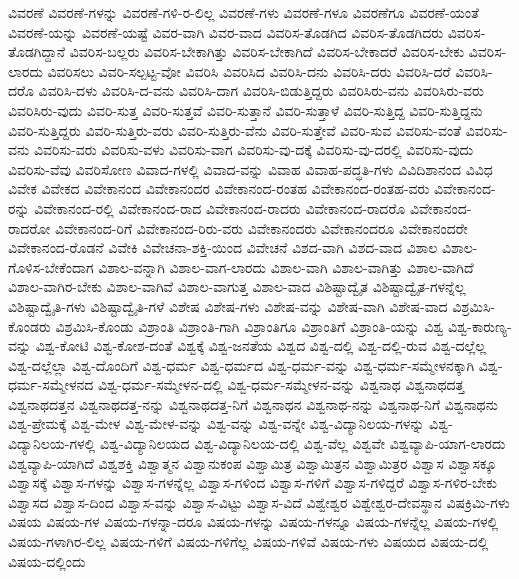 {ವಿವರಣೆ
ವಿವರಣೆ-ಗಳನ್ನು
ವಿವರಣೆ-ಗಳಿ-ರ-ಲಿಲ್ಲ
ವಿವರಣೆ-ಗಳು
ವಿವರಣೆ-ಗಳೂ
ವಿವರಣೆಗೂ
ವಿವರಣೆ-ಯಂತೆ
ವಿವರಣೆ-ಯನ್ನು
ವಿವರಣೆ-ಯಷ್ಟೆ
ವಿವರ-ವಾಗಿ
ವಿವರ-ವಾದ
ವಿವರಿಸ-ತೊಡಗಿದ
ವಿವರಿಸ-ತೊಡಗಿದರು
ವಿವರಿಸ-ತೊಡಗಿದ್ದಾನೆ
ವಿವರಿಸ-ಬಲ್ಲರು
ವಿವರಿಸ-ಬೇಕಾಗಿತ್ತು
ವಿವರಿಸ-ಬೇಕಾಗಿದೆ
ವಿವರಿಸ-ಬೇಕಾದರೆ
ವಿವರಿಸ-ಬೇಕು
ವಿವರಿಸ-ಲಾರದು
ವಿವರಿಸಲು
ವಿವರಿ-ಸಲ್ಪಟ್ಟ-ವೋ
ವಿವರಿಸಿ
ವಿವರಿಸಿದ
ವಿವರಿಸಿ-ದನು
ವಿವರಿಸಿ-ದರು
ವಿವರಿಸಿ-ದರೆ
ವಿವರಿಸಿ-ದರೊ
ವಿವರಿಸಿ-ದಳು
ವಿವರಿಸಿ-ದ-ವನು
ವಿವರಿಸಿ-ದಾಗ
ವಿವರಿಸಿ-ಬಿಡುತ್ತಿದ್ದರು
ವಿವರಿಸಿರು-ವನು
ವಿವರಿಸಿರು-ವರು
ವಿವರಿಸಿರು-ವುದು
ವಿವರಿ-ಸುತ್ತ
ವಿವರಿ-ಸುತ್ತವೆ
ವಿವರಿ-ಸುತ್ತಾನೆ
ವಿವರಿ-ಸುತ್ತಾಳೆ
ವಿವರಿ-ಸುತ್ತಿದ್ದ
ವಿವರಿ-ಸುತ್ತಿದ್ದನು
ವಿವರಿ-ಸುತ್ತಿದ್ದರು
ವಿವರಿ-ಸುತ್ತಿರು-ವರು
ವಿವರಿ-ಸುತ್ತಿರು-ವೆನು
ವಿವರಿ-ಸುತ್ತೇವೆ
ವಿವರಿ-ಸುವ
ವಿವರಿಸು-ವಂತೆ
ವಿವರಿಸು-ವನು
ವಿವರಿಸು-ವರು
ವಿವರಿಸು-ವಳು
ವಿವರಿಸು-ವಾಗ
ವಿವರಿಸು-ವು-ದಕ್ಕೆ
ವಿವರಿಸು-ವು-ದರಲ್ಲಿ
ವಿವರಿಸು-ವುದು
ವಿವರಿಸು-ವೆವು
ವಿವರಿಸೋಣ
ವಿವಾದ-ಗಳಲ್ಲಿ
ವಿವಾದ-ವನ್ನು
ವಿವಾಹ
ವಿವಾಹ-ಪದ್ಧತಿ-ಗಳು
ವಿವಿದಿಶಾನಂದ
ವಿವಿಧ
ವಿವೇಕ
ವಿವೇಕದ
ವಿವೇಕಾನಂದ
ವಿವೇಕಾನಂದರ
ವಿವೇಕಾನಂದ-ರಂತಹ
ವಿವೇಕಾನಂದ-ರಂತಹ-ವರು
ವಿವೇಕಾನಂದ-ರನ್ನು
ವಿವೇಕಾನಂದ-ರಲ್ಲಿ
ವಿವೇಕಾನಂದ-ರಾದ
ವಿವೇಕಾನಂದ-ರಾದರು
ವಿವೇಕಾನಂದ-ರಾದರೊ
ವಿವೇಕಾನಂದ-ರಾದರೋ
ವಿವೇಕಾನಂದ-ರಿಗೆ
ವಿವೇಕಾನಂದ-ರಿರು-ವರು
ವಿವೇಕಾನಂದರು
ವಿವೇಕಾನಂದರೂ
ವಿವೇಕಾನಂದರೇ
ವಿವೇಕಾನಂದ-ರೊಡನೆ
ವಿವೇಕಿ
ವಿವೇಚನಾ-ಶಕ್ತಿ-ಯಿಂದ
ವಿವೇಚನೆ
ವಿಶದ-ವಾಗಿ
ವಿಶದ-ವಾದ
ವಿಶಾಲ
ವಿಶಾಲ-ಗೊಳಿಸ-ಬೇಕೆಂದಾಗ
ವಿಶಾಲ-ವನ್ನಾಗಿ
ವಿಶಾಲ-ವಾಗ-ಲಾರದು
ವಿಶಾಲ-ವಾಗಿ
ವಿಶಾಲ-ವಾಗಿತ್ತು
ವಿಶಾಲ-ವಾಗಿದೆ
ವಿಶಾಲ-ವಾಗಿರ-ಬೇಕು
ವಿಶಾಲ-ವಾಗಿವೆ
ವಿಶಾಲ-ವಾಗುತ್ತ
ವಿಶಾಲ-ವಾದ
ವಿಶಿಷ್ಟಾದ್ವೈತ
ವಿಶಿಷ್ಟಾದ್ವೈತ-ಗಳನ್ನೆಲ್ಲ
ವಿಶಿಷ್ಟಾದ್ವೈತಿ-ಗಳು
ವಿಶಿಷ್ಟಾದ್ವೈತಿ-ಗಳೆ
ವಿಶೇಷ
ವಿಶೇಷ-ಗಳು
ವಿಶೇಷ-ವನ್ನು
ವಿಶೇಷ-ವಾಗಿ
ವಿಶೇಷ-ವಾದ
ವಿಶ್ರಮಿಸಿ-ಕೊಂಡರು
ವಿಶ್ರಮಿಸಿ-ಕೊಂಡು
ವಿಶ್ರಾಂತಿ
ವಿಶ್ರಾಂತಿ-ಗಾಗಿ
ವಿಶ್ರಾಂತಿಗೂ
ವಿಶ್ರಾಂತಿಗೆ
ವಿಶ್ರಾಂತಿ-ಯನ್ನು
ವಿಶ್ವ
ವಿಶ್ವ-ಕಾರುಣ್ಯ-ವನ್ನು
ವಿಶ್ವ-ಕೋಟಿ
ವಿಶ್ವ-ಕೋಶ-ದಂತೆ
ವಿಶ್ವಕ್ಕೆ
ವಿಶ್ವ-ಜನತೆಯ
ವಿಶ್ವದ
ವಿಶ್ವ-ದಲ್ಲಿ
ವಿಶ್ವ-ದಲ್ಲಿ-ರುವ
ವಿಶ್ವ-ದಲ್ಲೆಲ್ಲ
ವಿಶ್ವ-ದಲ್ಲೆಲ್ಲಾ
ವಿಶ್ವ-ದೊಂದಿಗೆ
ವಿಶ್ವ-ಧರ್ಮ
ವಿಶ್ವ-ಧರ್ಮದ
ವಿಶ್ವ-ಧರ್ಮ-ವನ್ನು
ವಿಶ್ವ-ಧರ್ಮ-ಸಮ್ಮೇಳನಕ್ಕಾಗಿ
ವಿಶ್ವ-ಧರ್ಮ-ಸಮ್ಮೇಳನದ
ವಿಶ್ವ-ಧರ್ಮ-ಸಮ್ಮೇಳನ-ದಲ್ಲಿ
ವಿಶ್ವ-ಧರ್ಮ-ಸಮ್ಮೇಳನ-ವನ್ನು
ವಿಶ್ವನಾಥ
ವಿಶ್ವನಾಥದತ್ತ
ವಿಶ್ವನಾಥದತ್ತನ
ವಿಶ್ವನಾಥದತ್ತ-ನನ್ನು
ವಿಶ್ವನಾಥದತ್ತ-ನಿಗೆ
ವಿಶ್ವನಾಥನ
ವಿಶ್ವನಾಥ-ನನ್ನು
ವಿಶ್ವನಾಥ-ನಿಗೆ
ವಿಶ್ವನಾಥನು
ವಿಶ್ವ-ಪ್ರೇಮಕ್ಕೆ
ವಿಶ್ವ-ಮೇಳ
ವಿಶ್ವ-ಮೇಳ-ವನ್ನು
ವಿಶ್ವ-ವನ್ನು
ವಿಶ್ವ-ವನ್ನೇ
ವಿಶ್ವ-ವಿದ್ಯಾನಿಲಯ-ಗಳನ್ನು
ವಿಶ್ವ-ವಿದ್ಯಾನಿಲಯ-ಗಳಲ್ಲಿ
ವಿಶ್ವ-ವಿದ್ಯಾನಿಲಯದ
ವಿಶ್ವ-ವಿದ್ಯಾನಿಲಯ-ದಲ್ಲಿ
ವಿಶ್ವ-ವೆಲ್ಲ
ವಿಶ್ವವೇ
ವಿಶ್ವವ್ಯಾಪಿ-ಯಾಗ-ಲಾರದು
ವಿಶ್ವವ್ಯಾಪಿ-ಯಾಗಿದೆ
ವಿಶ್ವಶಕ್ತಿ
ವಿಶ್ವಾತ್ಮನ
ವಿಶ್ವಾನುಕಂಪ
ವಿಶ್ವಾಮಿತ್ರ
ವಿಶ್ವಾಮಿತ್ರನ
ವಿಶ್ವಾಮಿತ್ರರ
ವಿಶ್ವಾಸ
ವಿಶ್ವಾಸಕ್ಕೂ
ವಿಶ್ವಾಸಕ್ಕೆ
ವಿಶ್ವಾಸ-ಗಳನ್ನು
ವಿಶ್ವಾಸ-ಗಳನ್ನೆಲ್ಲ
ವಿಶ್ವಾಸ-ಗಳಿಂದ
ವಿಶ್ವಾಸ-ಗಳಿಗೆ
ವಿಶ್ವಾಸ-ಗಳಿದ್ದರೆ
ವಿಶ್ವಾಸ-ಗಳಿರ-ಬೇಕು
ವಿಶ್ವಾಸದ
ವಿಶ್ವಾಸ-ದಿಂದ
ವಿಶ್ವಾಸ-ವನ್ನು
ವಿಶ್ವಾಸ-ವಿಟ್ಟು
ವಿಶ್ವಾಸ-ವಿದೆ
ವಿಶ್ವೇಶ್ವರ
ವಿಶ್ವೇಶ್ವರ-ದೇವಸ್ಥಾನ
ವಿಷಕ್ರಿಮಿ-ಗಳು
ವಿಷಯ
ವಿಷಯ-ಗಳ
ವಿಷಯ-ಗಳನ್ನಾ-ದರೂ
ವಿಷಯ-ಗಳನ್ನು
ವಿಷಯ-ಗಳನ್ನೂ
ವಿಷಯ-ಗಳನ್ನೆಲ್ಲ
ವಿಷಯ-ಗಳಲ್ಲಿ
ವಿಷಯ-ಗಳಾಗಿರ-ಲಿಲ್ಲ
ವಿಷಯ-ಗಳಿಗೆ
ವಿಷಯ-ಗಳಿಗೆಲ್ಲ
ವಿಷಯ-ಗಳಿವೆ
ವಿಷಯ-ಗಳು
ವಿಷಯದ
ವಿಷಯ-ದಲ್ಲಿ
ವಿಷಯ-ದಲ್ಲಿಂದು
}

